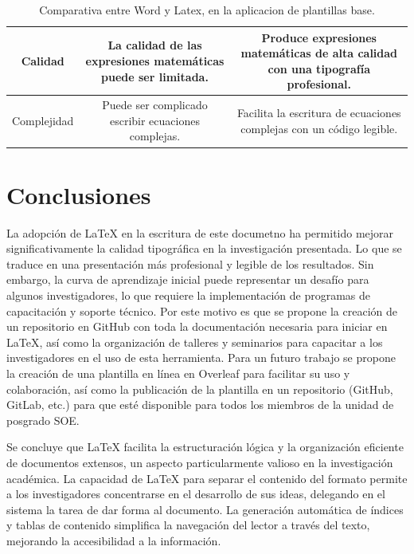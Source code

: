 \documentclass[10pt,twocolumn,a4paper]{article}
\begin{document}
\begin{table}[h!]
{\begin{tabular}{|c|c|c|}
            {Calidad}         & La calidad de las expresiones matemáticas puede ser limitada.         & Produce expresiones matemáticas de alta calidad con una tipografía profesional.\\ \hline
            {Complejidad}     & Puede ser complicado escribir ecuaciones complejas.          & Facilita la escritura de ecuaciones complejas con un código legible.              \\ \hline
            \end{tabular}
        }
        \caption{Comparativa entre Word y Latex, en la aplicacion de plantillas base.}
        \label{tab:Comparativas}
    \end{table}
\vspace{0.5cm}
    
    \section{Conclusiones}
    La adopción de LaTeX en la escritura de este documetno ha permitido mejorar significativamente la calidad tipográfica en la investigación presentada. 
    Lo que se traduce en una presentación más profesional y legible de los resultados. Sin embargo, la curva de aprendizaje inicial puede representar un desafío para algunos investigadores, lo que requiere la implementación de programas de capacitación y soporte técnico.
    Por este motivo es que se propone la creación de un repositorio en GitHub con toda la documentación necesaria para iniciar en LaTeX, así como la organización de talleres y seminarios para capacitar a los investigadores en el uso de esta herramienta.
    Para un futuro trabajo se propone la creación de una plantilla en línea en Overleaf para facilitar su uso y colaboración, así como la publicación de la plantilla en un repositorio (GitHub, GitLab, etc.) para que esté disponible para todos los miembros de la unidad de posgrado SOE.

    Se concluye que LaTeX facilita la estructuración lógica y la organización eficiente de documentos extensos, un aspecto particularmente valioso en la investigación académica. 
    La capacidad de LaTeX para separar el contenido del formato permite a los investigadores concentrarse en el desarrollo de sus ideas, delegando en el sistema la tarea de dar forma al documento. 
    La generación automática de índices y tablas de contenido simplifica la navegación del lector a través del texto, mejorando la accesibilidad a la información.

%
\printbibliography
%
\end{document}
